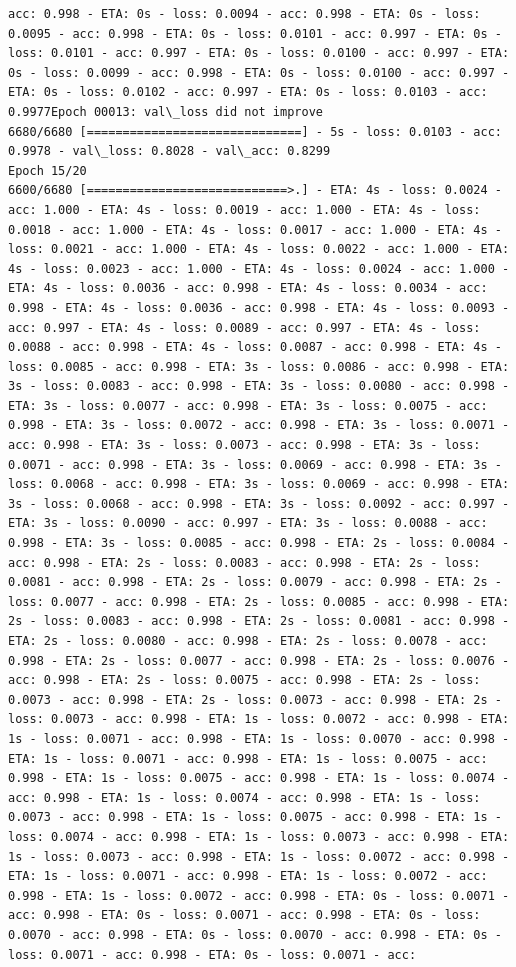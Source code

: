 \documentclass[11pt]{article}
\begin{document}
\begin{Verbatim}[commandchars=\\\{\}]
acc: 0.998 - ETA: 0s - loss: 0.0094 - acc: 0.998 - ETA: 0s - loss: 0.0095 - acc: 0.998 - ETA: 0s - loss: 0.0101 - acc: 0.997 - ETA: 0s - loss: 0.0101 - acc: 0.997 - ETA: 0s - loss: 0.0100 - acc: 0.997 - ETA: 0s - loss: 0.0099 - acc: 0.998 - ETA: 0s - loss: 0.0100 - acc: 0.997 - ETA: 0s - loss: 0.0102 - acc: 0.997 - ETA: 0s - loss: 0.0103 - acc: 0.9977Epoch 00013: val\_loss did not improve
6680/6680 [==============================] - 5s - loss: 0.0103 - acc: 0.9978 - val\_loss: 0.8028 - val\_acc: 0.8299
Epoch 15/20
6600/6680 [============================>.] - ETA: 4s - loss: 0.0024 - acc: 1.000 - ETA: 4s - loss: 0.0019 - acc: 1.000 - ETA: 4s - loss: 0.0018 - acc: 1.000 - ETA: 4s - loss: 0.0017 - acc: 1.000 - ETA: 4s - loss: 0.0021 - acc: 1.000 - ETA: 4s - loss: 0.0022 - acc: 1.000 - ETA: 4s - loss: 0.0023 - acc: 1.000 - ETA: 4s - loss: 0.0024 - acc: 1.000 - ETA: 4s - loss: 0.0036 - acc: 0.998 - ETA: 4s - loss: 0.0034 - acc: 0.998 - ETA: 4s - loss: 0.0036 - acc: 0.998 - ETA: 4s - loss: 0.0093 - acc: 0.997 - ETA: 4s - loss: 0.0089 - acc: 0.997 - ETA: 4s - loss: 0.0088 - acc: 0.998 - ETA: 4s - loss: 0.0087 - acc: 0.998 - ETA: 4s - loss: 0.0085 - acc: 0.998 - ETA: 3s - loss: 0.0086 - acc: 0.998 - ETA: 3s - loss: 0.0083 - acc: 0.998 - ETA: 3s - loss: 0.0080 - acc: 0.998 - ETA: 3s - loss: 0.0077 - acc: 0.998 - ETA: 3s - loss: 0.0075 - acc: 0.998 - ETA: 3s - loss: 0.0072 - acc: 0.998 - ETA: 3s - loss: 0.0071 - acc: 0.998 - ETA: 3s - loss: 0.0073 - acc: 0.998 - ETA: 3s - loss: 0.0071 - acc: 0.998 - ETA: 3s - loss: 0.0069 - acc: 0.998 - ETA: 3s - loss: 0.0068 - acc: 0.998 - ETA: 3s - loss: 0.0069 - acc: 0.998 - ETA: 3s - loss: 0.0068 - acc: 0.998 - ETA: 3s - loss: 0.0092 - acc: 0.997 - ETA: 3s - loss: 0.0090 - acc: 0.997 - ETA: 3s - loss: 0.0088 - acc: 0.998 - ETA: 3s - loss: 0.0085 - acc: 0.998 - ETA: 2s - loss: 0.0084 - acc: 0.998 - ETA: 2s - loss: 0.0083 - acc: 0.998 - ETA: 2s - loss: 0.0081 - acc: 0.998 - ETA: 2s - loss: 0.0079 - acc: 0.998 - ETA: 2s - loss: 0.0077 - acc: 0.998 - ETA: 2s - loss: 0.0085 - acc: 0.998 - ETA: 2s - loss: 0.0083 - acc: 0.998 - ETA: 2s - loss: 0.0081 - acc: 0.998 - ETA: 2s - loss: 0.0080 - acc: 0.998 - ETA: 2s - loss: 0.0078 - acc: 0.998 - ETA: 2s - loss: 0.0077 - acc: 0.998 - ETA: 2s - loss: 0.0076 - acc: 0.998 - ETA: 2s - loss: 0.0075 - acc: 0.998 - ETA: 2s - loss: 0.0073 - acc: 0.998 - ETA: 2s - loss: 0.0073 - acc: 0.998 - ETA: 2s - loss: 0.0073 - acc: 0.998 - ETA: 1s - loss: 0.0072 - acc: 0.998 - ETA: 1s - loss: 0.0071 - acc: 0.998 - ETA: 1s - loss: 0.0070 - acc: 0.998 - ETA: 1s - loss: 0.0071 - acc: 0.998 - ETA: 1s - loss: 0.0075 - acc: 0.998 - ETA: 1s - loss: 0.0075 - acc: 0.998 - ETA: 1s - loss: 0.0074 - acc: 0.998 - ETA: 1s - loss: 0.0074 - acc: 0.998 - ETA: 1s - loss: 0.0073 - acc: 0.998 - ETA: 1s - loss: 0.0075 - acc: 0.998 - ETA: 1s - loss: 0.0074 - acc: 0.998 - ETA: 1s - loss: 0.0073 - acc: 0.998 - ETA: 1s - loss: 0.0073 - acc: 0.998 - ETA: 1s - loss: 0.0072 - acc: 0.998 - ETA: 1s - loss: 0.0071 - acc: 0.998 - ETA: 1s - loss: 0.0072 - acc: 0.998 - ETA: 1s - loss: 0.0072 - acc: 0.998 - ETA: 0s - loss: 0.0071 - acc: 0.998 - ETA: 0s - loss: 0.0071 - acc: 0.998 - ETA: 0s - loss: 0.0070 - acc: 0.998 - ETA: 0s - loss: 0.0070 - acc: 0.998 - ETA: 0s - loss: 0.0071 - acc: 0.998 - ETA: 0s - loss: 0.0071 - acc: 
\end{Verbatim}
\end{document}
